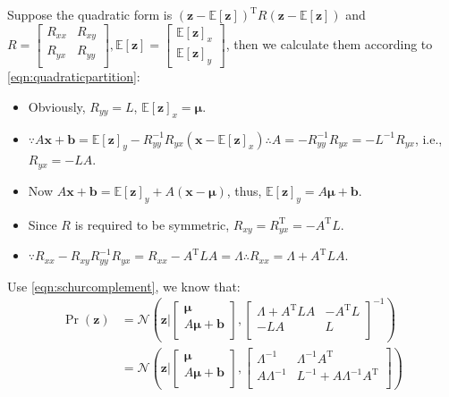 Suppose the quadratic form is
$(\mathbf{z}-\mathbb{E}[\mathbf{z}])^{\mathrm{T}}R(\mathbf{z}-\mathbb{E}[\mathbf{z}])$
and
$R=\begin{bmatrix}R_{xx}&R_{xy}\\R_{yx}&R_{yy}\\\end{bmatrix},\mathbb{E}[\mathbf{z}]=\begin{bmatrix}\mathbb{E}[\mathbf{z}]_{x}\\\mathbb{E}[\mathbf{z}]_{y}\end{bmatrix}$,
    then we calculate them according to \eqref{eqn:quadraticpartition}:
\begin{itemize}
\item Obviously, $R_{yy}=L$,
    $\mathbb{E}[\mathbf{z}]_{x}=\boldsymbol{\mu}$.
\item
$\because{}A\mathbf{x}+\mathbf{b}=\mathbb{E}[\mathbf{z}]_{y}-R_{yy}^{-1}R_{yx}(\mathbf{x}-\mathbb{E}[\mathbf{z}]_x)\therefore{}A=-R_{yy}^{-1}R_{yx}=-L^{-1}R_{yx}$,
    i.e., $R_{yx}=-LA$.
\item Now
$A\mathbf{x}+\mathbf{b}=\mathbb{E}[\mathbf{z}]_{y}+A(\mathbf{x}-\boldsymbol{\mu})$,
    thus, $\mathbb{E}[\mathbf{z}]_{y}=A\boldsymbol{\mu}+\mathbf{b}$.
\item Since $R$ is required to be symmetric,
    $R_{xy}=R_{yx}^{\mathrm{T}}=-A^{\mathrm{T}}L$.
\item
$\because{}R_{xx}-R_{xy}R_{yy}^{-1}R_{yx}=R_{xx}-A^{\mathrm{T}}LA=\Lambda\therefore{}R_{xx}=\Lambda+A^{\mathrm{T}}LA$.
\end{itemize}
Use \eqref{eqn:schurcomplement}, we know that:
\begin{equation}
\begin{split}
\Pr(\mathbf{z})&=\mathcal{N}(\mathbf{z}\vert{}\begin{bmatrix}\boldsymbol{\mu}\\A\boldsymbol{\mu}+\mathbf{b}\\\end{bmatrix},\begin{bmatrix}\Lambda+A^{\mathrm{T}}LA&-A^{\mathrm{T}}L\\-LA&L\\\end{bmatrix}^{-1})\\
&=\mathcal{N}(\mathbf{z}\vert{}\begin{bmatrix}\boldsymbol{\mu}\\A\boldsymbol{\mu}+\mathbf{b}\\\end{bmatrix},\begin{bmatrix}\Lambda^{-1}&\Lambda^{-1}A^{\mathrm{T}}\\A\Lambda^{-1}&L^{-1}+A\Lambda^{-1}A^{\mathrm{T}}\\\end{bmatrix})
\end{split}    
\label{eqn:gaussianxyjoint}
\end{equation}
